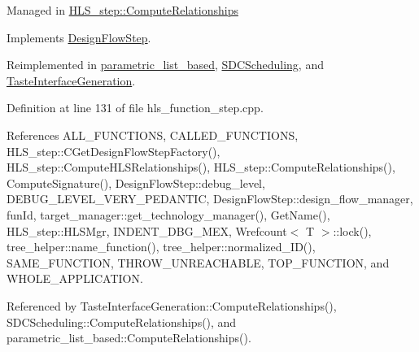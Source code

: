 Managed in \hyperlink{classHLS__step_ad5c58777d9b466fb3eee185f6d3ac993}{H\+L\+S\+\_\+step\+::\+Compute\+Relationships} 

Implements \hyperlink{classDesignFlowStep_a65bf7bcb603189a7ddcf930c3a9fd7fe}{Design\+Flow\+Step}.



Reimplemented in \hyperlink{classparametric__list__based_af4154cabe85bbd707fc5ee05981e54b0}{parametric\+\_\+list\+\_\+based}, \hyperlink{classSDCScheduling_a28390f2bb68bc997c4827f5dbd240ca5}{S\+D\+C\+Scheduling}, and \hyperlink{classTasteInterfaceGeneration_aef8be37534a1f17bdfdb6c26ff565fac}{Taste\+Interface\+Generation}.



Definition at line 131 of file hls\+\_\+function\+\_\+step.\+cpp.



References A\+L\+L\+\_\+\+F\+U\+N\+C\+T\+I\+O\+NS, C\+A\+L\+L\+E\+D\+\_\+\+F\+U\+N\+C\+T\+I\+O\+NS, H\+L\+S\+\_\+step\+::\+C\+Get\+Design\+Flow\+Step\+Factory(), H\+L\+S\+\_\+step\+::\+Compute\+H\+L\+S\+Relationships(), H\+L\+S\+\_\+step\+::\+Compute\+Relationships(), Compute\+Signature(), Design\+Flow\+Step\+::debug\+\_\+level, D\+E\+B\+U\+G\+\_\+\+L\+E\+V\+E\+L\+\_\+\+V\+E\+R\+Y\+\_\+\+P\+E\+D\+A\+N\+T\+IC, Design\+Flow\+Step\+::design\+\_\+flow\+\_\+manager, fun\+Id, target\+\_\+manager\+::get\+\_\+technology\+\_\+manager(), Get\+Name(), H\+L\+S\+\_\+step\+::\+H\+L\+S\+Mgr, I\+N\+D\+E\+N\+T\+\_\+\+D\+B\+G\+\_\+\+M\+EX, Wrefcount$<$ T $>$\+::lock(), tree\+\_\+helper\+::name\+\_\+function(), tree\+\_\+helper\+::normalized\+\_\+\+I\+D(), S\+A\+M\+E\+\_\+\+F\+U\+N\+C\+T\+I\+ON, T\+H\+R\+O\+W\+\_\+\+U\+N\+R\+E\+A\+C\+H\+A\+B\+LE, T\+O\+P\+\_\+\+F\+U\+N\+C\+T\+I\+ON, and W\+H\+O\+L\+E\+\_\+\+A\+P\+P\+L\+I\+C\+A\+T\+I\+ON.



Referenced by Taste\+Interface\+Generation\+::\+Compute\+Relationships(), S\+D\+C\+Scheduling\+::\+Compute\+Relationships(), and parametric\+\_\+list\+\_\+based\+::\+Compute\+Relationships().

